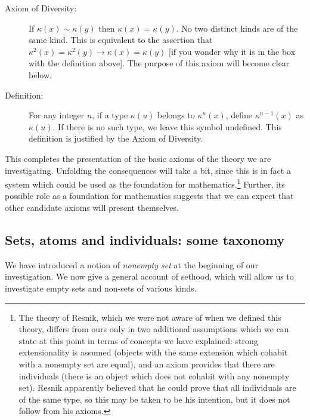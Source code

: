 \documentclass[12pt]{article}
\begin{document}
\begin{description}
\begin{description}
\item[Axiom of Diversity:]  If $\kappa(x) \sim \kappa(y)$ then $\kappa(x)=\kappa(y)$.  No two distinct kinds are of the same kind.  This is equivalent to the assertion that $\kappa^2(x) = \kappa^2(y) \rightarrow \kappa(x)=\kappa(y)$ [if you wonder why it is in the box with the definition above].  The purpose of this axiom will become clear below.

\item[Definition:]  For any integer $n$, if a type $\kappa(u)$ belongs to $\kappa^n(x)$, define
$\kappa^{n-1}(x)$ as $\kappa(u)$.  If there is no such type, we leave this symbol undefined.  This definition is justified by the Axiom of Diversity.

\end{description}

This completes the presentation of the basic axioms of the theory we are investigating.  Unfolding the consequences will take a bit, since this is in fact a system which could be used as the foundation for mathematics.\footnote{The theory of Resnik, which we were not aware of when we defined this theory, differs from ours only in two additional assumptions which we can state at this point in terms of concepts we have explained:  strong extensionality is assumed (objects with the same extension which cohabit with a nonempty set are equal), and an axiom provides that there are individuals (there is an object which does not cohabit with any nonempty set).  Resnik apparently believed that he could prove that all individuals are of the same type, so this may be taken to be his intention, but it does not follow from his axioms.}  Further, its possible role as a foundation for mathematics suggests that we can expect that other candidate axioms will present themselves.

\end{description}

\subsection{Sets, atoms and individuals: some taxonomy}

We have introduced a notion of {\em nonempty set\/} at the beginning of our investigation.  We now give a general account of sethood, which will allow us to investigate empty sets and non-sets of various kinds.
\end{document}
